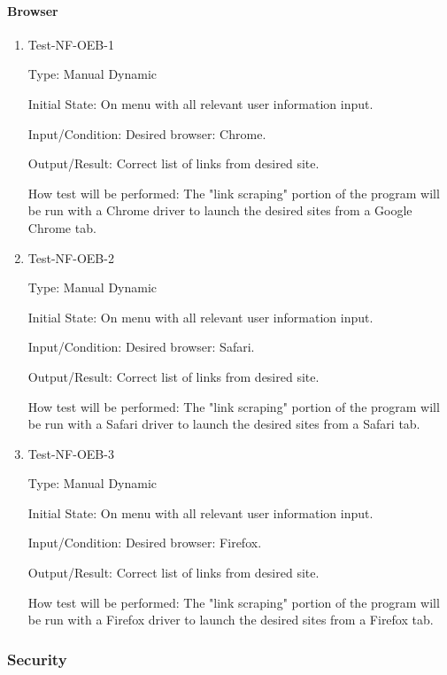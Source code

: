 \documentclass[12pt, titlepage]{article}
\makeatletter
\def\itemlabel#1#2{\def\@currentlabel{#2}\phantomsection\label{#1}}
\makeatother
\begin{document}
\itemlabel{para:NFOEB}{Test-NF-OEB-X}
\paragraph{Browser}

\begin{enumerate}

\item{Test-NF-OEB-1\\}

Type: Manual Dynamic
					
Initial State: On menu with all relevant user information input. 
					
Input/Condition: Desired browser: Chrome. 
					
Output/Result: Correct list of links from desired site. 
					
How test will be performed: The "link scraping" portion of the program will be run with a Chrome driver to launch the desired sites from a Google Chrome tab. 

\item{Test-NF-OEB-2\\}

Type: Manual Dynamic
					
Initial State: On menu with all relevant user information input.
					
Input/Condition: Desired browser: Safari.
					
Output/Result: Correct list of links from desired site. 
					
How test will be performed: The "link scraping" portion of the program will be run with a Safari driver to launch the desired sites from a Safari tab.

\item{Test-NF-OEB-3\\}

Type: Manual Dynamic
					
Initial State: On menu with all relevant user information input.
					
Input/Condition: Desired browser: Firefox.
					
Output/Result: Correct list of links from desired site. 
					
How test will be performed: The "link scraping" portion of the program will be run with a Firefox driver to launch the desired sites from a Firefox tab. 

\end{enumerate}

\subsubsection{Security}
\end{document}
